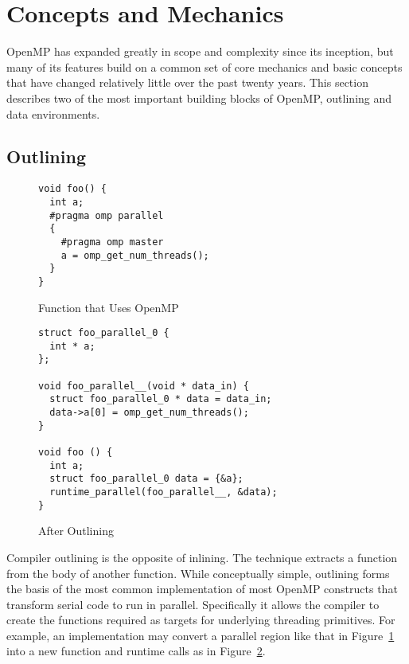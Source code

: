 \section{Concepts and Mechanics}
\label{sec:concepts}

OpenMP has expanded greatly in scope and complexity since its inception, but
many of its features build on a common set of core mechanics and basic concepts
that have changed relatively little over the past twenty years.  This section
describes two of the most important building blocks of OpenMP, outlining and
data environments.

\subsection{Outlining}
\label{sub:outlining}

\begin{figure}
\begin{verbatim}
void foo() {
  int a;
  #pragma omp parallel
  {
    #pragma omp master
    a = omp_get_num_threads();
  }
}
\end{verbatim}
\caption{Function that Uses OpenMP\label{fig:outline-before}}
\end{figure}

\begin{figure}
\begin{verbatim}
struct foo_parallel_0 {
  int * a;
};

void foo_parallel__(void * data_in) {
  struct foo_parallel_0 * data = data_in;
  data->a[0] = omp_get_num_threads();
}

void foo () {
  int a;
  struct foo_parallel_0 data = {&a};
  runtime_parallel(foo_parallel__, &data);
}
\end{verbatim}
\caption{After Outlining\label{fig:outline-after}}
\end{figure}

Compiler outlining is the opposite of inlining. The technique extracts a
function from the body of another function. While conceptually simple, 
outlining forms the basis of the most common implementation of most OpenMP 
constructs that transform serial code to run in parallel. Specifically it 
allows the compiler to create the functions required as targets for underlying
threading primitives. For example, an implementation may convert a parallel 
region like that in Figure~\ref{fig:outline-before} into a new function 
and runtime calls as in Figure~\ref{fig:outline-after}.

